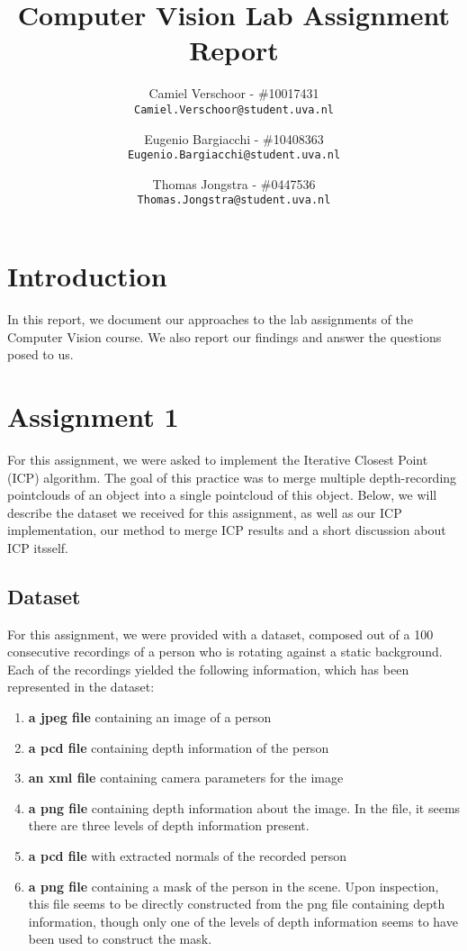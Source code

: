 \documentclass[11pt,english]{article}
\author{
  Camiel Verschoor - \#10017431\\
  \texttt{Camiel.Verschoor@student.uva.nl}
  \and
  Eugenio Bargiacchi - \#10408363\\
  \texttt{Eugenio.Bargiacchi@student.uva.nl}
  \and
  Thomas Jongstra - \#0447536\\
  \texttt{Thomas.Jongstra@student.uva.nl}
}
\title{Computer Vision Lab Assignment Report}
\begin{document}
\maketitle
\newpage
\section*{Introduction}
In this report, we document our approaches to the lab assignments of the Computer Vision course. We also report our findings and answer the questions posed to us.

\section{Assignment 1}

For this assignment, we were asked to implement the Iterative Closest Point (ICP) algorithm. The goal of this practice was to merge multiple depth-recording pointclouds of an object into a single pointcloud of this object. Below, we will describe the dataset we received for this assignment, as well as our ICP implementation, our method to merge ICP results and a short discussion about ICP itsself.

\subsection*{Dataset}
For this assignment, we were provided with a dataset, composed out of a 100 consecutive recordings of a person who is rotating against a static background. Each of the recordings yielded the following information, which has been represented in the dataset:

\begin{enumerate}
\item \textbf{a jpeg file} containing an image of a person
\item \textbf{a pcd file} containing depth information of the person
\item \textbf{an xml file} containing camera parameters for the image
\item \textbf{a png file} containing depth information about the image. In the file, it seems there are three levels of depth information present.
\item \textbf{a pcd file} with extracted normals of the recorded person
\item \textbf{a png file} containing a mask of the person in the scene. Upon inspection, this file seems to be directly constructed from the png file containing depth information, though only one of the levels of depth information seems to have been used to construct the mask.
\end{enumerate}
\end{document}
